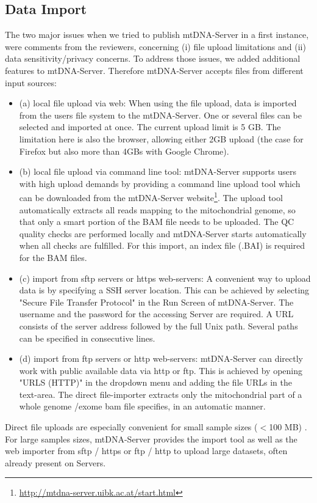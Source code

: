 \subsection{Data Import}
The two major issues when we tried to publish mtDNA-Server in a first instance, were comments from the reviewers, concerning (i) file upload limitations and (ii) data sensitivity/privacy concerns. 
To address those issues, we added additional features to mtDNA-Server. Therefore mtDNA-Server accepts files from different input sources:
\begin{itemize}
\item  (a) local file upload via web: When using the file upload, data is imported from the users file system to the mtDNA-Server. One or several files can be selected and imported at once. The current upload limit is 5 GB. The limitation here is also the browser, allowing either 2GB upload (the case for Firefox but also more than 4GBs with Google Chrome). 
\item  (b) local file upload via command line tool: mtDNA-Server supports users with high upload demands by providing a command line upload tool which can be downloaded from the mtDNA-Server website\footnote{\url{http://mtdna-server.uibk.ac.at/start.html}}. The upload tool automatically extracts all reads mapping to the mitochondrial genome, so that only a smart portion of the BAM file needs to be uploaded. The QC quality checks are performed locally and mtDNA-Server starts automatically when all checks are fulfilled. For this import, an index file (.BAI) is required for the BAM files. 
\item  (c) import from sftp servers or https web-servers: A convenient way to upload data is by specifying a SSH server location. This can be achieved by selecting "Secure File Transfer Protocol" in the Run Screen of mtDNA-Server. The username and the password for the accessing Server are required. A URL consists of the server address followed by the full Unix path. Several paths can be specified in consecutive lines.
\item  (d) import from ftp servers or http web-servers: mtDNA-Server can directly work with public available data via http or ftp. This is achieved by opening "URLS (HTTP)" in the dropdown menu and adding the file URLs in the text-area. The direct file-importer extracts only the mitochondrial part of a whole genome /exome bam file specifies, in an automatic manner. 
\end{itemize}
Direct file uploads are especially convenient for small sample sizes ($<$100 MB)  \cite{Weissensteiner2016b}. For large samples sizes, mtDNA-Server provides the import tool as well as the web importer from sftp / https or ftp / http to upload large datasets, often already present on Servers. 
